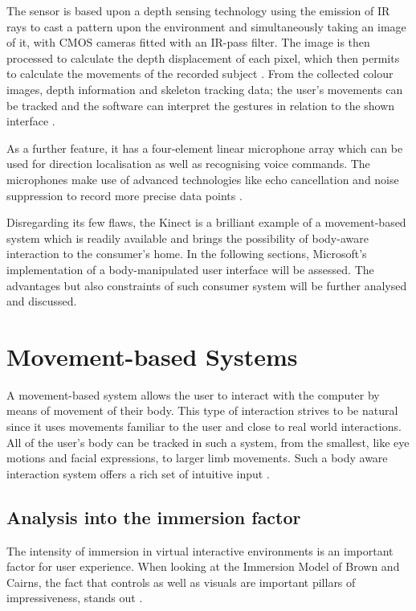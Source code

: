 \documentclass{sigchi}
\begin{document}
The sensor is based upon a depth sensing technology using the emission of IR rays to cast a pattern upon the environment and simultaneously taking an image of it, with CMOS cameras fitted with an IR-pass filter. The image is then processed to calculate the depth displacement of each pixel, which then permits to calculate the movements of the recorded subject \cite{Andersen2012}. From the collected colour images, depth information and skeleton tracking data; the user’s movements can be tracked and the software can interpret the gestures in relation to the shown interface \cite{Francese2012}.

As a further feature, it has a four-element linear microphone array which can be used for direction localisation as well as recognising voice commands. The microphones make use of advanced technologies like echo cancellation and noise suppression to record more precise data points \cite{Francese2012}. 

Disregarding its few flaws, the Kinect is a brilliant example of a movement-based system which is readily available and brings the possibility of body-aware interaction to the consumer’s home. In the following sections, Microsoft’s implementation of a body-manipulated user interface will be assessed. The advantages but also constraints of such consumer system will be further analysed and discussed.

\section{Movement-based Systems}
A movement-based system allows the user to interact with the computer by means of movement of their body. This type of interaction strives to be natural since it uses movements familiar to the user and close to real world interactions. All of the user’s body can be tracked in such a system, from the smallest, like eye motions and facial expressions, to larger limb movements. Such a body aware interaction system offers a rich set of intuitive input \cite{Pasch2009}.

\subsection{Analysis into the immersion factor}
The intensity of immersion in virtual interactive environments is an important factor for user experience. When looking at the Immersion Model of Brown and Cairns, the fact that controls as well as visuals are important pillars of impressiveness, stands out \cite{Pasch2009}.
\end{document}
